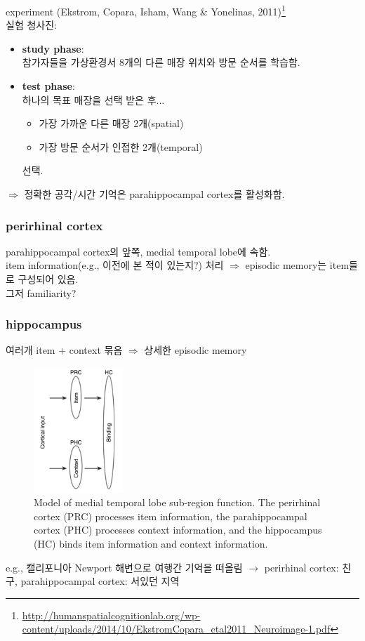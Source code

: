 \documentclass[../note.tex]{subfiles}
\begin{document}
\begin{note}{experiment (Ekstrom, Copara, Isham, Wang & Yonelinas,
  2011)\footnote{\url{http://humanspatialcognitionlab.org/wp-content/uploads/2014/10/EkstromCopara\_etal2011\_Neuroimage-1.pdf}}}\\
  실험 청사진:
  \begin{itemize}
    \item \textbf{study phase}:\\
      참가자들을 가상환경서 8개의 다른 매장 위치와 방문 순서를 학습함.
    \item \textbf{test phase}: \\
      하나의 목표 매장을 선택 받은 후...
      \begin{itemize}
        \item 가장 가까운 다른 매장 2개(spatial)
        \item 가장 방문 순서가 인접한 2개(temporal)
      \end{itemize}
      선택.
  \end{itemize}
  $\Rightarrow$ 정확한 공각/시간 기억은 parahippocampal cortex를 활성화함.
\end{note}

\subsubsection{perirhinal cortex}
parahippocampal cortex의 앞쪽, medial temporal lobe에 속함.\\
item information(e.g., 이전에 본 적이 있는지?) 처리 $\Rightarrow$ episodic memory는 item들로 구성되어 있음.\\
그저 familiarity?

\subsubsection{hippocampus}
여러개 item + context 묶음 $\Rightarrow$ 상세한 episodic memory
\begin{figure}[htbp]
  \centering
  \includegraphics[width=0.3\textwidth]{image/hippocampus}
  \caption{Model of medial temporal lobe sub-region function. The perirhinal cortex (PRC)
    processes item information, the parahippocampal cortex (PHC) processes context
    information, and the hippocampus (HC) binds item information and context information.}
  \label{fig:hippocampus}
\end{figure}
e.g., 캘리포니아 Newport 해변으로 여행간 기억을 떠올림 $\rightarrow$ perirhinal cortex: 친구, parahippocampal cortex: 서있던 지역
\end{document}
